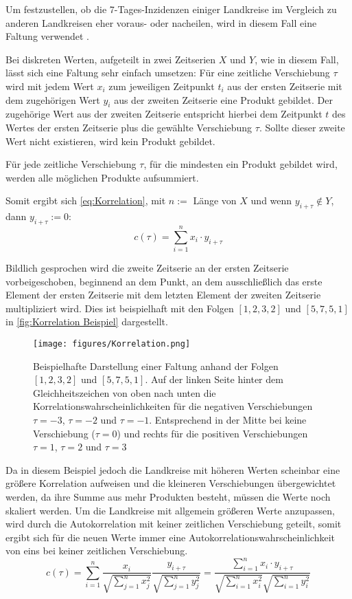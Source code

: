 Um festzustellen, ob die 7-Tages-Inzidenzen einiger Landkreise im Vergleich zu anderen Landkreisen eher voraus- oder nacheilen, wird in diesem Fall eine \glqq{}Faltung\grqq{} verwendet \autocite{Korrelation}.

Bei diskreten Werten, aufgeteilt in zwei Zeitserien $X$ und $Y$, wie in diesem Fall, lässt sich eine Faltung sehr einfach umsetzen:
Für eine zeitliche Verschiebung $\tau$ wird mit jedem Wert $x_i$ zum jeweiligen Zeitpunkt $t_i$ aus der ersten Zeitserie mit dem zugehörigen Wert $y_i$ aus der zweiten Zeitserie eine Produkt gebildet. Der zugehörige Wert aus der zweiten Zeitserie entspricht hierbei dem Zeitpunkt $t$ des Wertes der ersten Zeitserie plus die gewählte Verschiebung $\tau$. Sollte dieser zweite Wert nicht existieren, wird kein Produkt gebildet.

Für jede zeitliche Verschiebung $\tau$, für die mindesten ein Produkt gebildet wird, werden alle möglichen Produkte aufsummiert.

Somit ergibt sich \autoref{eq:Korrelation}, mit $n := $ Länge von $X$ und wenn $y_{i+\tau} \not\in Y$, dann $y_{i+\tau} := 0$:
\begin{equation}\label{eq:Korrelation}
    c(\tau) = \sum_{i=1}^n x_i\cdot y_{i+\tau}
\end{equation}


Bildlich gesprochen wird die zweite Zeitserie an der ersten Zeitserie vorbeigeschoben, beginnend an dem Punkt, an dem ausschließlich das erste Element der ersten Zeitserie mit dem letzten Element der zweiten Zeitserie multipliziert wird. Dies ist beispielhaft mit den Folgen $[1,2,3,2]$ und $[5,7,5,1]$ in \autoref{fig:Korrelation Beispiel} dargestellt.

\begin{figure}
    \centering
    \texttt{[image: figures/Korrelation.png]}
    \caption{Beispielhafte Darstellung einer Faltung anhand der Folgen $[1,2,3,2]$ und $[5,7,5,1]$. Auf der linken Seite hinter dem Gleichheitszeichen von oben nach unten die Korrelationswahrscheinlichkeiten für die negativen Verschiebungen $\tau=-3$, $\tau=-2$ und $\tau=-1$. Entsprechend in der Mitte bei keine Verschiebung ($\tau=0$) und rechts für die positiven Verschiebungen $\tau=1$, $\tau=2$ und $\tau=3$}
    \label{fig:Korrelation Beispiel}
\end{figure}

Da in diesem Beispiel jedoch die Landkreise mit höheren Werten scheinbar eine größere Korrelation aufweisen und die kleineren Verschiebungen übergewichtet werden, da ihre Summe aus mehr Produkten besteht, müssen die Werte noch skaliert werden.
Um die Landkreise mit allgemein größeren Werte anzupassen, wird durch die Autokorrelation mit keiner zeitlichen Verschiebung
geteilt, somit ergibt sich für die neuen Werte immer eine Autokorrelationswahrscheinlichkeit von eins bei keiner zeitlichen Verschiebung.
\begin{equation}\label{eq:Korrelation}
    c(\tau) =\sum_{i=1}^n \frac{x_i}{\sqrt{\sum_{j=1}^n x_j^2}}
    \frac{y_{i+\tau}}{\sqrt{\sum_{j=1}^n y_j^2}}= 
    \frac{\sum_{i=1}^n x_i\cdot y_{i+\tau}}{\sqrt{\sum_{i=1}^n x_i^2}\sqrt{\sum_{i=1}^n y_i^2}}
\end{equation}

